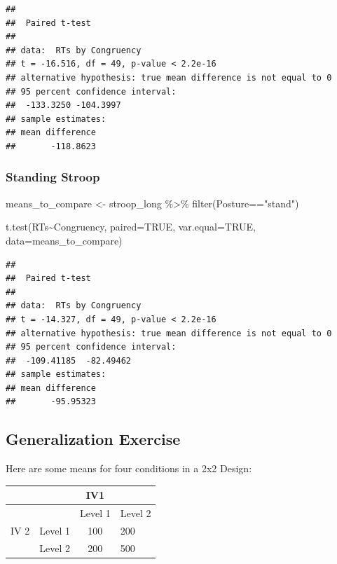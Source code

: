 \documentclass[
]{book}
\newenvironment{Shaded}{\begin{snugshade}}{\end{snugshade}}
\newcommand{\AttributeTok}[1]{\textcolor[rgb]{0.77,0.63,0.00}{#1}}
\newcommand{\ConstantTok}[1]{\textcolor[rgb]{0.00,0.00,0.00}{#1}}
\newcommand{\FunctionTok}[1]{\textcolor[rgb]{0.00,0.00,0.00}{#1}}
\newcommand{\NormalTok}[1]{#1}
\newcommand{\OtherTok}[1]{\textcolor[rgb]{0.56,0.35,0.01}{#1}}
\newcommand{\SpecialCharTok}[1]{\textcolor[rgb]{0.00,0.00,0.00}{#1}}
\newcommand{\StringTok}[1]{\textcolor[rgb]{0.31,0.60,0.02}{#1}}
\begin{document}
\begin{verbatim}
## 
##  Paired t-test
## 
## data:  RTs by Congruency
## t = -16.516, df = 49, p-value < 2.2e-16
## alternative hypothesis: true mean difference is not equal to 0
## 95 percent confidence interval:
##  -133.3250 -104.3997
## sample estimates:
## mean difference 
##       -118.8623
\end{verbatim}

\hypertarget{standing-stroop}{%
\subsubsection{Standing Stroop}\label{standing-stroop}}

\begin{Shaded}
\begin{Highlighting}[]
\NormalTok{means\_to\_compare }\OtherTok{\textless{}{-}}\NormalTok{ stroop\_long }\SpecialCharTok{\%\textgreater{}\%}
                      \FunctionTok{filter}\NormalTok{(Posture}\SpecialCharTok{==}\StringTok{"stand"}\NormalTok{)}

\FunctionTok{t.test}\NormalTok{(RTs}\SpecialCharTok{\textasciitilde{}}\NormalTok{Congruency, }\AttributeTok{paired=}\ConstantTok{TRUE}\NormalTok{, }\AttributeTok{var.equal=}\ConstantTok{TRUE}\NormalTok{, }\AttributeTok{data=}\NormalTok{means\_to\_compare)}
\end{Highlighting}
\end{Shaded}

\begin{verbatim}
## 
##  Paired t-test
## 
## data:  RTs by Congruency
## t = -14.327, df = 49, p-value < 2.2e-16
## alternative hypothesis: true mean difference is not equal to 0
## 95 percent confidence interval:
##  -109.41185  -82.49462
## sample estimates:
## mean difference 
##       -95.95323
\end{verbatim}

\hypertarget{generalization-exercise-9}{%
\subsection{Generalization Exercise}\label{generalization-exercise-9}}

Here are some means for four conditions in a 2x2 Design:

\begin{longtable}[]{@{}llcl@{}}
\toprule()
& & IV1 & \\
\midrule()
\endhead
& & Level 1 & Level 2 \\
IV 2 & Level 1 & 100 & 200 \\
& Level 2 & 200 & 500 \\
\bottomrule()
\end{longtable}
\end{document}
